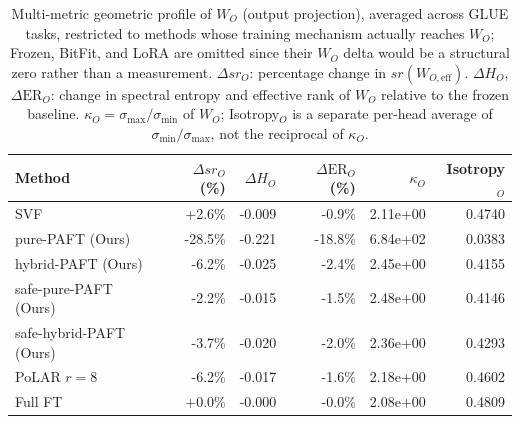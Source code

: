 \begin{table}[t]
\centering
\caption{Multi-metric geometric profile of $W_O$ (output projection), averaged across GLUE tasks, restricted to methods whose training mechanism actually reaches $W_O$; Frozen, BitFit, and LoRA are omitted since their $W_O$ delta would be a structural zero rather than a measurement. $\Delta sr_O$: percentage change in $sr(W_{O,\mathrm{eff}})$. $\Delta H_O$, $\Delta\mathrm{ER}_O$: change in spectral entropy and effective rank of $W_O$ relative to the frozen baseline. $\kappa_O = \sigma_\mathrm{max}/\sigma_\mathrm{min}$ of $W_O$; Isotropy$_O$ is a separate per-head average of $\sigma_\mathrm{min}/\sigma_\mathrm{max}$, not the reciprocal of $\kappa_O$.}
\label{tab:wO_metrics}
\setlength{\tabcolsep}{5pt}
\renewcommand{\arraystretch}{1.10}
\begin{tabular}{lrrrrr}
\toprule
\textbf{Method} & $\Delta sr_O$ (\%) & $\Delta H_O$ & $\Delta\mathrm{ER}_O$ (\%) & $\kappa_O$ & Isotropy$_O$ \\
\midrule
SVF & +2.6\% & -0.009 & -0.9\% & 2.11e+00 & 0.4740 \\
\midrule
pure-PAFT (Ours) & -28.5\% & -0.221 & -18.8\% & 6.84e+02 & 0.0383 \\
hybrid-PAFT (Ours) & -6.2\% & -0.025 & -2.4\% & 2.45e+00 & 0.4155 \\
safe-pure-PAFT (Ours) & -2.2\% & -0.015 & -1.5\% & 2.48e+00 & 0.4146 \\
safe-hybrid-PAFT (Ours) & -3.7\% & -0.020 & -2.0\% & 2.36e+00 & 0.4293 \\
\midrule
PoLAR $r{=}8$ & -6.2\% & -0.017 & -1.6\% & 2.18e+00 & 0.4602 \\
\midrule
Full FT & +0.0\% & -0.000 & -0.0\% & 2.08e+00 & 0.4809 \\
\bottomrule
\end{tabular}
\end{table}
